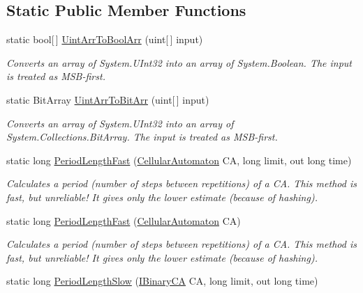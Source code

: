 \subsection*{Static Public Member Functions}
\begin{DoxyCompactItemize}
\item 
static bool\mbox{[}$\,$\mbox{]} \hyperlink{class_cellular_1_1_utilities_a6f1fcc096938174c779453fb588cbfdb}{Uint\+Arr\+To\+Bool\+Arr} (uint\mbox{[}$\,$\mbox{]} input)
\begin{DoxyCompactList}\small\item\em Converts an array of {\ttfamily System.\+U\+Int32} into an array of {\ttfamily System.\+Boolean}. The input is treated as M\+S\+B-\/first. \end{DoxyCompactList}\item 
static Bit\+Array \hyperlink{class_cellular_1_1_utilities_a3e6d6ebde1b445f03d3c0b1a9c0274e6}{Uint\+Arr\+To\+Bit\+Arr} (uint\mbox{[}$\,$\mbox{]} input)
\begin{DoxyCompactList}\small\item\em Converts an array of {\ttfamily System.\+U\+Int32} into an array of {\ttfamily System.\+Collections.\+Bit\+Array}. The input is treated as M\+S\+B-\/first. \end{DoxyCompactList}\item 
static long \hyperlink{class_cellular_1_1_utilities_a8ebd90cf7f8d6ce2235d26f9feeddfae}{Period\+Length\+Fast} (\hyperlink{class_cellular_1_1_cellular_automaton}{Cellular\+Automaton} C\+A, long limit, out long time)
\begin{DoxyCompactList}\small\item\em Calculates a period (number of steps between repetitions) of a C\+A. This method is fast, but unreliable! It gives only the lower estimate (because of hashing). \end{DoxyCompactList}\item 
static long \hyperlink{class_cellular_1_1_utilities_a7a43545f264bf30884c8486a14fb4f43}{Period\+Length\+Fast} (\hyperlink{class_cellular_1_1_cellular_automaton}{Cellular\+Automaton} C\+A)
\begin{DoxyCompactList}\small\item\em Calculates a period (number of steps between repetitions) of a C\+A. This method is fast, but unreliable! It gives only the lower estimate (because of hashing). \end{DoxyCompactList}\item 
static long \hyperlink{class_cellular_1_1_utilities_aa0b71d2f39b127f7078a35263adbfd55}{Period\+Length\+Slow} (\hyperlink{interface_cellular_1_1_i_binary_c_a}{I\+Binary\+C\+A} C\+A, long limit, out long time)

\end{DoxyCompactItemize}
